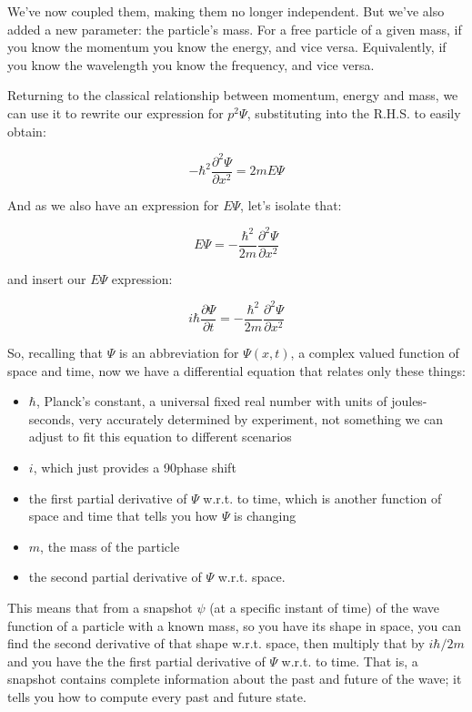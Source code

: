 We've now coupled them, making them no longer independent. But we've also added a new parameter: the particle's mass. For a free particle of a given mass, if you know the momentum you know the energy, and vice versa. Equivalently, if you know the wavelength you know the frequency, and vice versa.

Returning to the classical relationship between momentum, energy and mass, we can use it to rewrite our expression for $p^2 \Psi$, substituting into the R.H.S. to easily obtain:

$$
- \hbar^2 \frac{\partial^2 \Psi}{\partial x^2}
= 2mE\Psi
$$

And as we also have an expression for $E\Psi$, let's isolate that:

$$
E\Psi =
- \frac{\hbar^2}{2m} \frac{\partial^2 \Psi}{\partial x^2}
$$

and insert our $E\Psi$ expression:

$$
i\hbar \frac{\partial \Psi}{\partial t}
=
- \frac{\hbar^2}{2m} \frac{\partial^2 \Psi}{\partial x^2}
$$

So, recalling that $\Psi$ is an abbreviation for $\Psi(x, t)$, a complex valued function of space and time, now we have a differential equation that relates only these things:

\begin{itemize}
  \item $\hbar$, Planck's constant, a universal fixed real number with units of joules-seconds, very accurately determined by experiment, not something we can adjust to fit this equation to different scenarios
  \item $i$, which just provides a 90\textdegree phase shift
  \item the first partial derivative of $\Psi$ w.r.t. to time, which is another function of space and time that tells you how $\Psi$ is changing
  \item $m$, the mass of the particle
  \item the second partial derivative of $\Psi$ w.r.t. space.
\end{itemize}

This means that from a snapshot $\psi$ (at a specific instant of time) of the wave function of a particle with a known mass, so you have its shape in space, you can find the second derivative of that shape w.r.t. space, then multiply that by $i\hbar/2m$ and you have the the first partial derivative of $\Psi$ w.r.t. to time. That is, a snapshot contains complete information about the past and future of the wave; it tells you how to compute every past and future state.

